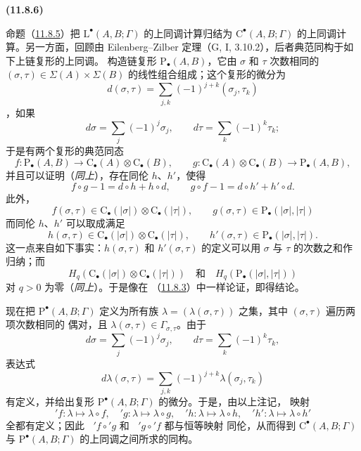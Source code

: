 \documentclass[UTF8,fontset=none,11pt,oneside,openany]{ctexbook}
\newenvironment{env}[1][]{%
  \par\medskip\noindent\textbf{(#1)}\ %
}{\par}
\newcommand{\oldpage}[2][]{%
  \hypertarget{ega-source-page-#1-#2}{}%
  \marginnote{\scriptsize\textbf{#1}~|~#2}\ignorespaces}
\let\EGAOriginalLabel\label
\renewcommand{\label}[1]{\phantomsection\EGAOriginalLabel{#1}}
\begin{document}
\begin{env}[11.8.6]
\label{0.11.8.6-fr}
\oldpage[0\textsubscript{III}]{45}
命题（\hyperref[0.11.8.5-fr]{11.8.5}）把
$\mathrm L^\bullet(A,B;\Gamma)$ 的上同调计算归结为
$\mathrm C^\bullet(A,B;\Gamma)$ 的上同调计算。另一方面，回顾由
Eilenberg--Zilber 定理（G, I, 3.10.2），后者典范同构于如下上链复形的上同调。
构造链复形 $\mathrm P_\bullet(A,B)$，它由 $\sigma$ 和 $\tau$ 次数相同的
$(\sigma,\tau)\in\Sigma(A)\times\Sigma(B)$ 的线性组合组成；这个复形的微分为
\[
d(\sigma,\tau)=\sum_{j,k}(-1)^{j+k}(\sigma_j,\tau_k)
\]
，如果
\[
d\sigma=\sum_j(-1)^j\sigma_j,\qquad
d\tau=\sum_k(-1)^k\tau_k;
\]
于是有两个复形的典范同态
\[
f:\mathrm P_\bullet(A,B)\longrightarrow
\mathrm C_\bullet(A)\otimes\mathrm C_\bullet(B),\qquad
g:\mathrm C_\bullet(A)\otimes\mathrm C_\bullet(B)
\longrightarrow\mathrm P_\bullet(A,B),
\]
并且可以证明（\emph{同上}），存在同伦 $h$、$h'$，使得
\[
f\circ g-1=d\circ h+h\circ d,\qquad
g\circ f-1=d\circ h'+h'\circ d.
\]
此外，
\[
f(\sigma,\tau)\in\mathrm C_\bullet(|\sigma|)
\otimes\mathrm C_\bullet(|\tau|),\qquad
g(\sigma,\tau)\in\mathrm P_\bullet(|\sigma|,|\tau|)
\]
而同伦 $h$、$h'$ 可以取成满足
\[
h(\sigma,\tau)\in\mathrm C_\bullet(|\sigma|)
\otimes\mathrm C_\bullet(|\tau|),\qquad
h'(\sigma,\tau)\in\mathrm P_\bullet(|\sigma|,|\tau|).
\]
这一点来自如下事实：$h(\sigma,\tau)$ 和 $h'(\sigma,\tau)$ 的定义可以用
$\sigma$ 与 $\tau$ 的次数之和作归纳；而
\[
H_q(\mathrm C_\bullet(|\sigma|)\otimes\mathrm C_\bullet(|\tau|))
\quad\text{和}\quad
H_q(\mathrm P_\bullet(|\sigma|,|\tau|))
\]
对 $q>0$ 为零（\emph{同上}）。于是像在
（\hyperref[0.11.8.3-fr]{11.8.3}）中一样论证，即得结论。

现在把 $\mathrm P^\bullet(A,B;\Gamma)$ 定义为所有族
$\lambda=(\lambda(\sigma,\tau))$ 之集，其中 $(\sigma,\tau)$ 遍历两项次数相同的
偶对，且 $\lambda(\sigma,\tau)\in\Gamma_{\sigma,\tau}$。由于
\[
d\sigma=\sum_j(-1)^j\sigma_j,\qquad
d\tau=\sum_k(-1)^k\tau_k,
\]
表达式
\[
d\lambda(\sigma,\tau)=
\sum_{j,k}(-1)^{j+k}\lambda(\sigma_j,\tau_k)
\]
有定义，并给出复形 $\mathrm P^\bullet(A,B;\Gamma)$ 的微分。于是，由以上注记，
映射
\[
{}'f:\lambda\mapsto\lambda\circ f,\quad
{}'g:\lambda\mapsto\lambda\circ g,\quad
{}'h:\lambda\mapsto\lambda\circ h,\quad
{}'h':\lambda\mapsto\lambda\circ h'
\]
全都有定义；因此 $\mathop{}'f\circ{}'g$ 和 $\mathop{}'g\circ{}'f$ 都与恒等映射
同伦，从而得到 $\mathrm C^\bullet(A,B;\Gamma)$ 与
$\mathrm P^\bullet(A,B;\Gamma)$ 的上同调之间所求的同构。
\end{env}
\end{document}
